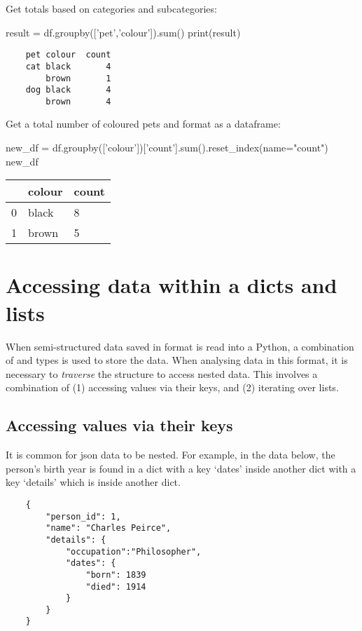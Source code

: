 Get totals based on categories and subcategories:

\begin{pycode}
    result = df.groupby(['pet','colour']).sum()
    print(result)
\end{pycode}

\begin{verbatim}
    pet colour  count
    cat black       4
        brown       1
    dog black       4
        brown       4
\end{verbatim}

Get a total number of coloured pets and format as a dataframe:

\begin{pycode}
    new_df = df.groupby(['colour'])['count'].sum().reset_index(name="count")
    new_df
\end{pycode}

\begin{tabular}{l l l}
    &colour	&count \\
    \hline
    0	&black	&8 \\
    1	&brown	&5\\
\end{tabular}

\section{Accessing data within a dicts and lists}

When semi-structured data saved in  format is read into a Python, a combination of  and  types is used to store the data. When analysing data in this format, it is necessary to \textit{traverse} the structure to access nested data. This involves a combination of (1) accessing values via their keys, and (2) iterating over lists.

\subsection{Accessing values via their keys}

It is common for json data to be nested. For example, in the data below, the person's birth year is found in a dict with a key `dates' inside another dict with a key `details' which is inside another dict.

\begin{verbatim}
    {
        "person_id": 1,
        "name": "Charles Peirce",
        "details": {
            "occupation":"Philosopher",
            "dates": {
                "born": 1839
                "died": 1914
            }
        }
    }
\end{verbatim}

